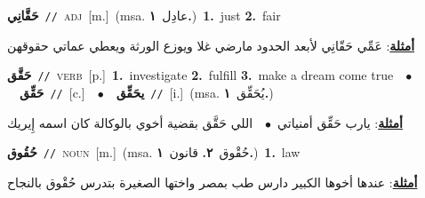 \documentclass[10pt,a4paper,twoside]{article} %
\begin{document}
\begin{multicols}{2}
{\setlength\topsep{0pt}\textbf{\foreignlanguage{arabic}{حَقَّانِي}}\ {\color{gray}\texttt{//}\color{black}}\ \textsc{adj}\ [m.]\ \color{gray}(msa. \foreignlanguage{arabic}{عادِل}~\foreignlanguage{arabic}{\textbf{١.}})\color{black}\ \textbf{1.}~just  \textbf{2.}~fair\  \begin{flushright}\color{gray}\foreignlanguage{arabic}{\textbf{\underline{\foreignlanguage{arabic}{أمثلة}}}: عَمِّي حَقّانِي لأبعد الحدود مارضي غلا ويوزع الورثة ويعطي عماتي حقوقهن}\end{flushright}\color{black}} \vspace{2mm}

{\setlength\topsep{0pt}\textbf{\foreignlanguage{arabic}{حَقَّق}}\ {\color{gray}\texttt{//}\color{black}}\ \textsc{verb}\ [p.]\ \textbf{1.}~investigate  \textbf{2.}~fulfill  \textbf{3.}~make a dream come true\ \ $\bullet$\ \ \setlength\topsep{0pt}\textbf{\foreignlanguage{arabic}{حَقِّق}}\ {\color{gray}\texttt{//}\color{black}}\ [c.]\ \ $\bullet$\ \ \setlength\topsep{0pt}\textbf{\foreignlanguage{arabic}{يحَقِّق}}\ {\color{gray}\texttt{//}\color{black}}\ [i.]\ \color{gray}(msa. \foreignlanguage{arabic}{يُحَقِّق}~\foreignlanguage{arabic}{\textbf{١.}})\color{black}\  \begin{flushright}\color{gray}\foreignlanguage{arabic}{\textbf{\underline{\foreignlanguage{arabic}{أمثلة}}}: يارب حَقِّق أمنياتي\ $\bullet$\ \  اللي حَقَّق بقضية أخوي بالوكالة كان اسمه إِيريك}\end{flushright}\color{black}} \vspace{2mm}

{\setlength\topsep{0pt}\textbf{\foreignlanguage{arabic}{حُقُوق}}\ {\color{gray}\texttt{//}\color{black}}\ \textsc{noun}\ [m.]\ \color{gray}(msa. \foreignlanguage{arabic}{حُقْوق}~\foreignlanguage{arabic}{\textbf{٢.}}  \foreignlanguage{arabic}{قانون}~\foreignlanguage{arabic}{\textbf{١.}})\color{black}\ \textbf{1.}~law\  \begin{flushright}\color{gray}\foreignlanguage{arabic}{\textbf{\underline{\foreignlanguage{arabic}{أمثلة}}}: عندها أخوها الكبير دارس طب بمصر واختها الصغيرة بتدرس حُقْوق بالنجاح}\end{flushright}\color{black}} \vspace{2mm}


\end{multicols}
\end{document}
